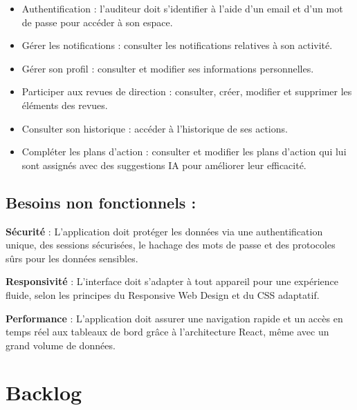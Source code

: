 \begin{itemize}
  \item Authentification : l'auditeur doit s'identifier à l'aide d'un email et d'un mot de passe pour accéder à son espace.
  \item Gérer les notifications : consulter les notifications relatives à son activité.
  \item Gérer son profil : consulter et modifier ses informations personnelles.
  \item Participer aux revues de direction : consulter, créer, modifier et supprimer les éléments des revues.
  \item Consulter son historique : accéder à l'historique de ses actions.
  \item Compléter les plans d'action : consulter et modifier les plans d'action qui lui sont assignés avec des suggestions IA pour améliorer leur efficacité.
\end{itemize}


\subsection{Besoins non fonctionnels :}

\noindent \textbf{Sécurité} : L'application doit protéger les données via une authentification unique, des sessions sécurisées, le hachage des mots de passe et des protocoles sûrs pour les données sensibles.

\noindent \textbf{Responsivité} : L'interface doit s’adapter à tout appareil pour une expérience fluide, selon les principes du Responsive Web Design et du CSS adaptatif.

\noindent \textbf{Performance} : L'application doit assurer une navigation rapide et un accès en temps réel aux tableaux de bord grâce à l’architecture React, même avec un grand volume de données.
\section{Backlog}

